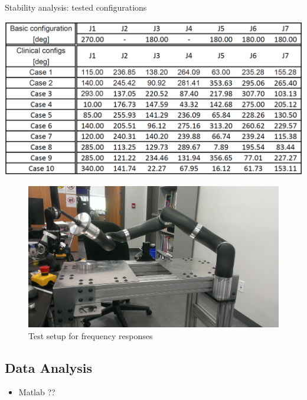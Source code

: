 	\begin{table}[t]
		\centering
		\caption{Stability analysis: tested configurations}
		\includegraphics[width=.8\textwidth]{./images/configs.pdf}%
		\label{table:cases}
	\end{table}

\begin{figure}
	\begin{center}
		\includegraphics[width=1\textwidth]{./images/bed.jpg}%
		\caption{Test setup for frequency responses}
		\label{fig:bed}
	\end{center}
\end{figure}


%


\subsection{Data Analysis}
\begin{itemize}
	\item Matlab ??
\end{itemize}

